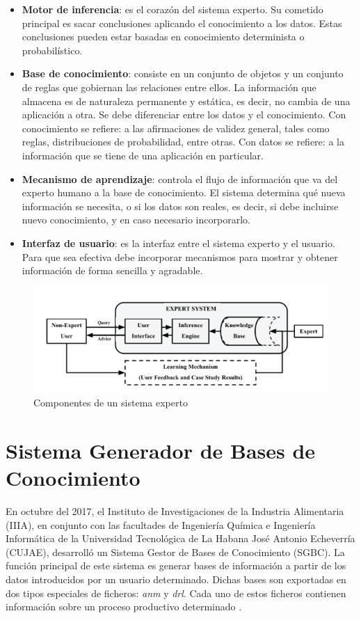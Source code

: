 \begin{itemize}
\item \textbf{Motor de inferencia}: es el corazón del sistema experto. Su cometido principal es sacar conclusiones aplicando el conocimiento a los datos. Estas conclusiones pueden estar basadas en conocimiento determinista o probabilístico.
\item \textbf{Base de conocimiento}: consiste en un conjunto de objetos y un conjunto de reglas que gobiernan las relaciones entre ellos. La información que almacena es de naturaleza permanente y estática, es decir, no cambia de una aplicación a otra. Se debe diferenciar entre los datos y el conocimiento. Con conocimiento se refiere: a las afirmaciones de validez general, tales como reglas, distribuciones de probabilidad, entre otras. Con datos se refiere: a la información que se tiene de una aplicación en particular.
\item \textbf{Mecanismo de aprendizaje}: controla el flujo de información que va del experto humano a la base de conocimiento. El sistema determina qué nueva información se necesita, o si los datos son reales, es decir, si debe incluirse nuevo conocimiento, y en caso necesario incorporarlo.
\item \textbf{Interfaz de usuario}: es la interfaz entre el sistema experto y el usuario. Para que sea efectiva debe incorporar mecanismos para mostrar y obtener información de forma sencilla y agradable.
\end{itemize}

\begin{figure}[h]
\centering
 \includegraphics[width=0.7\linewidth]{imagen/componentes.png}
 \caption{Componentes de un sistema experto}
 \label{fig:componentes} 
\end{figure}

\section{Sistema Generador de Bases de Conocimiento}
En octubre del 2017, el Instituto de Investigaciones de la Industria Alimentaria (IIIA), en conjunto con las facultades de Ingeniería Química e Ingeniería Informática de la Universidad Tecnológica de La Habana José Antonio Echeverría (CUJAE), desarrolló un Sistema Gestor de Bases de Conocimiento (SGBC). La función principal de este sistema es generar bases de información a partir de los datos introducidos por un usuario determinado. Dichas bases son exportadas en dos tipos especiales de ficheros: \textsl{anm} y \textsl{drl}. Cada uno de estos ficheros contienen información sobre un proceso productivo determinado \cite{Lemus2018}.

